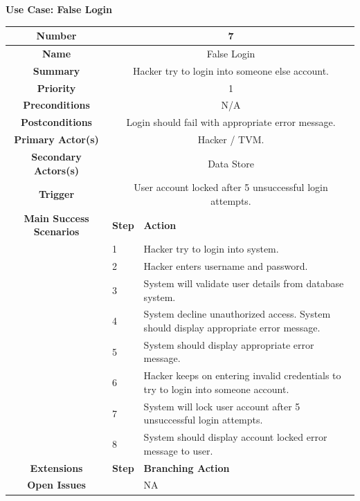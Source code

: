 \documentclass[a4paper,12pt]{report}
\begin{document}


\vspace{0.5cm}
\textbf{\large Use Case: False Login}
\\

\begin{tabular}{ | c | p{2cm} | p{7cm} |}
	
	\hline
	\textbf{Number} & \multicolumn{2}{c|}{7}  \\
	\hline
	\textbf{Name} & \multicolumn{2}{c|}{False Login}  \\
	\hline
	\textbf{Summary} & \multicolumn{2}{c|}{Hacker try to login into someone else account.}  \\
	\hline
	\textbf{Priority} & \multicolumn{2}{c|}{1}  \\
	\hline
	\textbf{Preconditions} & \multicolumn{2}{c|}{N/A}  \\
	\hline
	\textbf{Postconditions} & \multicolumn{2}{c|}{Login should fail with appropriate error message.}  \\
	\hline
	\textbf{Primary Actor(s)} & \multicolumn{2}{c|}{Hacker / TVM.}  \\
	\hline
	\textbf{Secondary Actors(s)} & \multicolumn{2}{c|}{Data Store}  \\
	\hline
	\textbf{Trigger} & \multicolumn{2}{c|}{User account locked after 5 unsuccessful login attempts.} \\
	\hline
	\textbf{Main Success Scenarios} & \textbf{Step} & \textbf{Action} \\
	\hline
	& 1 & Hacker try to login into system. \\ 
	\hline
	&  2  & Hacker enters username and password. \\
	\hline
	&  3  & System will validate user details from database system. \\
	\hline
	&  4  & System decline unauthorized access. System should display appropriate error message. \\
	\hline
	&  5  & System should display appropriate error message. \\
	\hline
	&  6  & Hacker keeps on entering invalid credentials to try to login into someone account. \\
	\hline
	&  7  & System will lock user account after 5 unsuccessful login attempts. \\
	\hline
	& 8 & System should display account locked error message to user. \\
	\hline
	
	\textbf{Extensions} & \textbf{Step} & \textbf{Branching Action} \\
	\hline
	\textbf{Open Issues} &    & NA \\
	\hline
	
\end{tabular}
\end{document}
